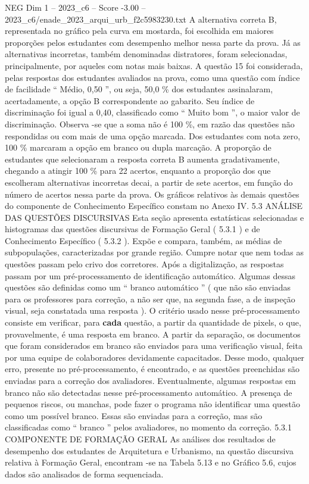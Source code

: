 \begin{textsample}{NEG Dim 1 – 2023\_c6 – Score -3.00 – 2023\_c6/enade\_2023\_arqui\_urb\_f2c5983230.txt}
A alternativa correta B, representada no gráfico pela curva em mostarda, foi escolhida em maiores proporções pelos estudantes com desempenho melhor nessa parte da prova.
Já as alternativas incorretas, também denominadas distratores, foram selecionadas, principalmente, por aqueles com notas mais baixas.
A questão 15 foi considerada, pelas respostas dos estudantes avaliados na prova, como uma questão com índice de facilidade “ Médio, 0,50 ”, ou seja, 50,0 \% dos estudantes assinalaram, acertadamente, a opção B correspondente ao gabarito.
Seu índice de discriminação foi igual a 0,40, classificado como “ Muito bom ”, o maior valor de discriminação.
Observa -se que a soma não é 100 \%, em razão das questões não respondidas ou com mais de uma opção marcada.
Dos estudantes com nota zero, 100 \% marcaram a opção em branco ou dupla marcação.
A proporção de estudantes que selecionaram a resposta correta B aumenta gradativamente, chegando a atingir 100 \% para 22 acertos, enquanto a proporção dos que escolheram alternativas incorretas decai, a partir de sete acertos, em função do número de acertos nessa parte da prova.
Os gráficos relativos às demais questões do componente de Conhecimento Específico constam no Anexo IV. 5.3 ANÁLISE DAS QUESTÕES DISCURSIVAS Esta seção apresenta estatísticas selecionadas e histogramas das questões discursivas de Formação Geral ( 5.3.1 ) e de Conhecimento Específico ( 5.3.2 ).
Expõe e compara, também, as médias de subpopulações, caracterizadas por grande região.
Cumpre notar que nem todas as questões passam pelo crivo dos corretores.
Após a digitalização, as respostas passam por um pré-processamento de identificação automático.
Algumas dessas questões são definidas como um “ branco automático ” ( que não são enviadas para os professores para correção, a não ser que, na segunda fase, a de inspeção visual, seja constatada uma resposta ).
O critério usado nesse pré-processamento consiste em verificar, para \textbf{cada} questão, a partir da quantidade de pixels, o que, provavelmente, é uma resposta em branco.
A partir da separação, os documentos que foram considerados em branco são enviados para uma verificação visual, feita por uma equipe de colaboradores devidamente capacitados.
Desse modo, qualquer erro, presente no pré-processamento, é encontrado, e as questões preenchidas são enviadas para a correção dos avaliadores.
Eventualmente, algumas respostas em branco não são detectadas nesse pré-processamento automático.
A presença de pequenos riscos, ou manchas, pode fazer o programa não identificar uma questão como um possível branco.
Essas são enviadas para a correção, mas são classificadas como “ branco ” pelos avaliadores, no momento da correção. 5.3.1 COMPONENTE DE FORMAÇÃO GERAL As análises dos resultados de desempenho dos estudantes de Arquitetura e Urbanismo, na questão discursiva relativa à Formação Geral, encontram -se na Tabela 5.13 e no Gráfico 5.6, cujos dados são analisados de forma sequenciada.

\end{textsample}
